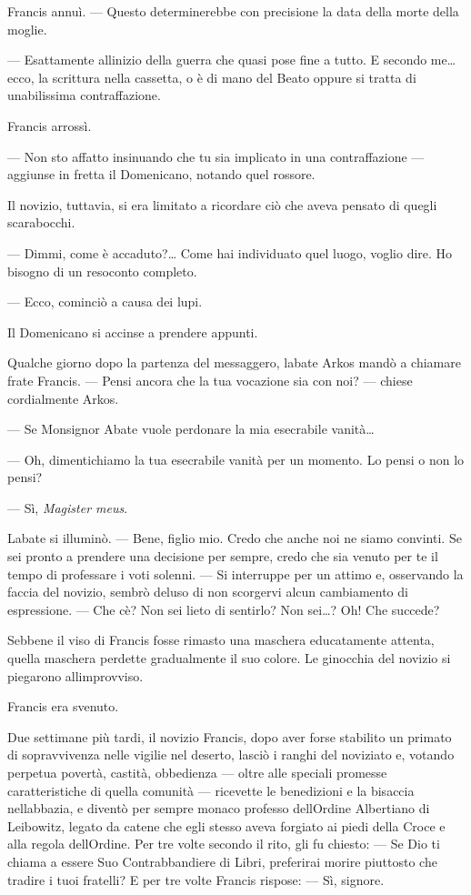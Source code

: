 Francis annuì. --- Questo determinerebbe con precisione la data della
morte della moglie.

--- Esattamente all\textquotesingle inizio della guerra che quasi pose
fine a tutto. E secondo me\ldots{} ecco, la scrittura nella cassetta, o
è di mano del Beato oppure si tratta di un\textquotesingle abilissima
contraffazione.

Francis arrossì.

--- Non sto affatto insinuando che tu sia implicato in una
contraffazione --- aggiunse in fretta il Domenicano, notando quel
rossore.

Il novizio, tuttavia, si era limitato a ricordare ciò che aveva pensato
di quegli scarabocchi.

--- Dimmi, come è accaduto?\ldots{} Come hai individuato quel luogo,
voglio dire. Ho bisogno di un resoconto completo.

--- Ecco, cominciò a causa dei lupi.

Il Domenicano si accinse a prendere appunti.

Qualche giorno dopo la partenza del messaggero, l\textquotesingle abate
Arkos mandò a chiamare frate Francis. --- Pensi ancora che la tua
vocazione sia con noi? --- chiese cordialmente Arkos.

--- Se Monsignor Abate vuole perdonare la mia esecrabile vanità\ldots{}

--- Oh, dimentichiamo la tua esecrabile vanità per un momento. Lo pensi
o non lo pensi?

--- Sì, \emph{Magister meus}.

L\textquotesingle abate si illuminò. --- Bene, figlio mio. Credo che
anche noi ne siamo convinti. Se sei pronto a prendere una decisione per
sempre, credo che sia venuto per te il tempo di professare i voti
solenni. --- Si interruppe per un attimo e, osservando la faccia del
novizio, sembrò deluso di non scorgervi alcun cambiamento di
espressione. --- Che c\textquotesingle è? Non sei lieto di sentirlo? Non
sei\ldots? Oh! Che succede?

Sebbene il viso di Francis fosse rimasto una maschera educatamente
attenta, quella maschera perdette gradualmente il suo colore. Le
ginocchia del novizio si piegarono all\textquotesingle improvviso.

Francis era svenuto.

Due settimane più tardi, il novizio Francis, dopo aver forse stabilito
un primato di sopravvivenza nelle vigilie nel deserto, lasciò i ranghi
del noviziato e, votando perpetua povertà, castità, obbedienza --- oltre
alle speciali promesse caratteristiche di quella comunità --- ricevette
le benedizioni e la bisaccia nell\textquotesingle abbazia, e diventò per
sempre monaco professo dell\textquotesingle Ordine Albertiano di
Leibowitz, legato da catene che egli stesso aveva forgiato ai piedi
della Croce e alla regola dell\textquotesingle Ordine. Per tre volte
secondo il rito, gli fu chiesto: --- Se Dio ti chiama a essere Suo
Contrabbandiere di Libri, preferirai morire piuttosto che tradire i tuoi
fratelli? E per tre volte Francis rispose: --- Sì, signore.

